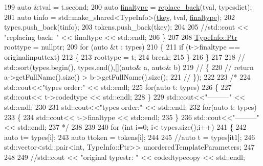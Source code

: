 \begin{DoxyCode}
199         \textcolor{keyword}{auto} &tval = t.second;
200         \textcolor{keyword}{auto} \hyperlink{classsmacc_1_1introspection_1_1TypeInfo_aa4010ed427e12db443e08ab16a3de243}{finaltype} = \hyperlink{namespacesmacc_1_1introspection_a19350163cda321a04645dcd6f6585f24}{replace\_back}(tval, typesdict);
201         \textcolor{keyword}{auto} tinfo = std::make\_shared<TypeInfo>(\hyperlink{classsmacc_1_1introspection_1_1TypeInfo_a697dd505119258dba1224d10eea5b2bd}{tkey}, tval, \hyperlink{classsmacc_1_1introspection_1_1TypeInfo_aa4010ed427e12db443e08ab16a3de243}{finaltype});
202         types.push\_back(tinfo);
203         tokens.push\_back(tkey);
204 
205         \textcolor{comment}{//std::cout << "replacing back: " << finaltype << std::endl;}
206     \}
207 
208     \hyperlink{classsmacc_1_1introspection_1_1TypeInfo_aa6ffd9c39811d59f7c771941b7fad860}{TypeInfo::Ptr} roottype = \textcolor{keyword}{nullptr};
209     \textcolor{keywordflow}{for} (\textcolor{keyword}{auto} &t : types)
210     \{
211         \textcolor{keywordflow}{if} (t->finaltype == originalinputtext)
212         \{
213             roottype = t;
214             \textcolor{keywordflow}{break};
215         \}
216     \}
217 
218     \textcolor{comment}{// std::sort(types.begin(), types.end(),[](auto& a, auto& b)}
219     \textcolor{comment}{// \{}
220     \textcolor{comment}{//     return a->getFullName().size() > b->getFullName().size();}
221     \textcolor{comment}{// \});}
222 
223     \textcolor{comment}{/*}
224 \textcolor{comment}{    std::cout<<"types order:" << std::endl;}
225 \textcolor{comment}{    for(auto t: types)}
226 \textcolor{comment}{    \{}
227 \textcolor{comment}{        std::cout<< t->codedtype << std::endl;}
228 \textcolor{comment}{    \}}
229 \textcolor{comment}{    std::cout<<"---------" << std::endl;}
230 \textcolor{comment}{}
231 \textcolor{comment}{    std::cout<<"types order:" << std::endl;}
232 \textcolor{comment}{    for(auto t: types)}
233 \textcolor{comment}{    \{}
234 \textcolor{comment}{        std::cout<< t->finaltype << std::endl;}
235 \textcolor{comment}{    \}}
236 \textcolor{comment}{    std::cout<<"---------" << std::endl;}
237 \textcolor{comment}{    */}
238 
239     
240     \textcolor{keywordflow}{for} (\textcolor{keywordtype}{int} i=0; i< types.size();i++)
241     \{
242         \textcolor{keyword}{auto} t= types[i];
243         \textcolor{keyword}{auto} ttoken = tokens[i];
244 
245         \textcolor{comment}{//auto t = types[it1];}
246         std::vector<std::pair<int, TypeInfo::Ptr>> unorderedTemplateParameters;
247 
248         
249         \textcolor{comment}{//std::cout << "original typestr: " << codedtypecopy << std::endl;}

\end{DoxyCode}
